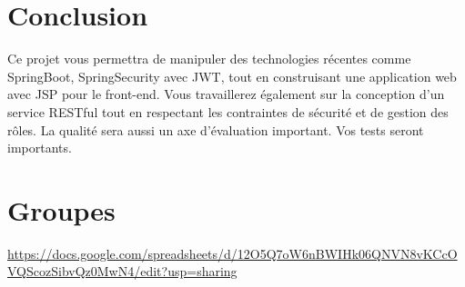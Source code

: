 \documentclass{article}%
\begin{document}

\section{Conclusion}

Ce projet vous permettra de manipuler des technologies récentes comme SpringBoot, SpringSecurity avec JWT, tout en construisant une application web avec JSP pour le front-end. Vous
travaillerez également sur la conception d'un service RESTful tout en respectant les contraintes de
sécurité et de gestion des rôles. La qualité sera aussi un axe d’évaluation important. Vos tests seront
importants.


\section{Groupes}

\url{https://docs.google.com/spreadsheets/d/12O5Q7oW6nBWIHk06QNVN8vKCcOVQScozSibvQz0MwN4/edit?usp=sharing}
\end{document}
